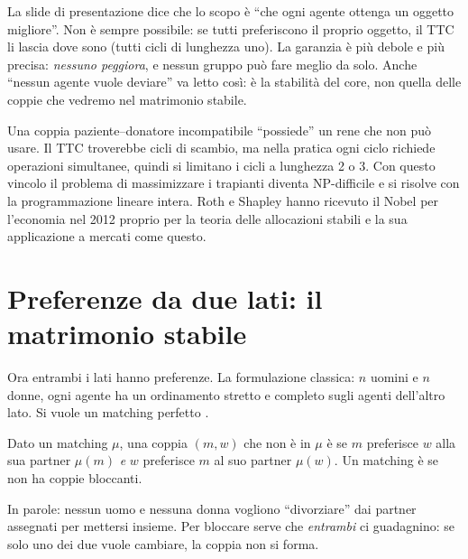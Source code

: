 \begin{attenzione}
La slide di presentazione dice che lo scopo è ``che ogni agente ottenga un oggetto
migliore''. Non è sempre possibile: se tutti preferiscono il proprio oggetto, il TTC li
lascia dove sono (tutti cicli di lunghezza uno). La garanzia è più debole e più precisa:
\emph{nessuno peggiora}, e nessun gruppo può fare meglio da solo. Anche ``nessun agente
vuole deviare'' va letto così: è la stabilità del core, non quella delle coppie che vedremo
nel matrimonio stabile.
\end{attenzione}

\begin{extra}
Una coppia paziente--donatore incompatibile ``possiede'' un rene che non può usare. Il TTC
troverebbe cicli di scambio, ma nella pratica ogni ciclo richiede operazioni simultanee,
quindi si limitano i cicli a lunghezza 2 o 3. Con questo vincolo il problema di massimizzare
i trapianti diventa NP-difficile e si risolve con la programmazione lineare intera. Roth e
Shapley hanno ricevuto il Nobel per l'economia nel 2012 proprio per la teoria delle
allocazioni stabili e la sua applicazione a mercati come questo.
\end{extra}

\section{Preferenze da due lati: il matrimonio stabile}

Ora entrambi i lati hanno preferenze. La formulazione classica: $n$ uomini e $n$ donne, ogni
agente ha un ordinamento stretto e completo sugli agenti dell'altro lato. Si vuole un
matching perfetto .

\begin{definizione}
Dato un matching $\mu$, una coppia $(m, w)$ che non è in $\mu$ è  se $m$
preferisce $w$ alla sua partner $\mu(m)$ \emph{e} $w$ preferisce $m$ al suo partner
$\mu(w)$. Un matching è  se non ha coppie bloccanti.
\end{definizione}

In parole: nessun uomo e nessuna donna vogliono ``divorziare'' dai partner assegnati per
mettersi insieme. Per bloccare serve che \emph{entrambi} ci guadagnino: se solo uno dei due
vuole cambiare, la coppia non si forma.

